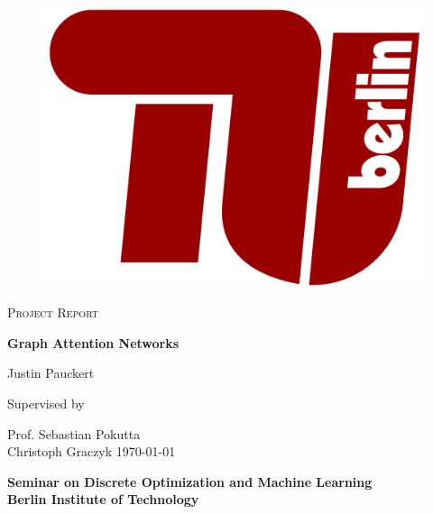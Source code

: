 \begin{titlepage}
    \begin{center}
        \vspace*{0cm}
        
        \begin{figure}[h]
        \begin{center}
        \includegraphics[width=.3\columnwidth]{logo.png}
        \end{center}
        \end{figure}
        \vspace*{1cm}
        
        \LARGE
        \textsc{Project Report}
        \vspace{1cm}
                
        \Huge
        \textbf{Graph Attention Networks}
        \vspace{1.5cm}
        
        \LARGE
        Justin Pauckert
        \vspace{1.5cm}
        
        \large 
        Supervised by
        \vspace{.5cm}
        
        \Large 
        Prof. Sebastian Pokutta\\
        Christoph Graczyk
        \vspace{.2cm}
        \vfill
        {\small \monthyeardate\today}
        
        \vspace{1cm}       
        {\Large \textbf{
            Seminar on Discrete Optimization and Machine Learning \\
            Berlin Institute of Technology
            }
        }    
    \end{center}
\end{titlepage}